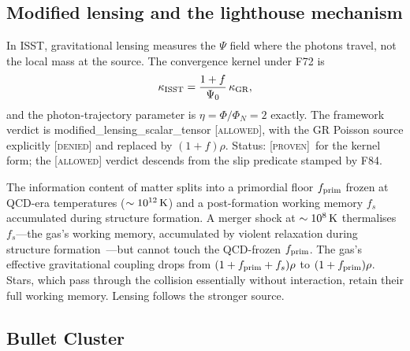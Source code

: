 \documentclass[aps,prd,twocolumn,nofootinbib,floatfix,superscriptaddress]{revtex4-2}
\newcommand{\PROVEN}{{\color{black!75!green}\textsc{[proven]}}}
\newcommand{\fprim}{f_{\rm prim}}
\begin{document}
\subsection{Modified lensing and the lighthouse mechanism}

In ISST, gravitational lensing measures the $\Psi$ field where the
photons travel, not the local mass at the source. The convergence
kernel under F72 is
\begin{equation}
\kappa_{\rm ISST} = \frac{1+f}{\Psi_0}\,\kappa_{\rm GR},
\end{equation}
and the photon-trajectory parameter is $\eta = \Phi/\Phi_N = 2$
exactly. The framework verdict is
\textsf{modified\_lensing\_scalar\_tensor} \textsc{[allowed]}, with
the GR Poisson source explicitly \textsc{[denied]} and replaced by
$(1{+}f)\rho$. Status: \PROVEN\ for the kernel form; the
\textsc{[allowed]} verdict descends from the slip predicate stamped
by F84.

The information content of matter splits into a primordial floor
$\fprim$ frozen at QCD-era temperatures ($\sim 10^{12}\,{\rm K}$) and
a post-formation working memory $f_s$ accumulated during structure
formation. A merger shock at $\sim 10^8\,{\rm K}$ thermalises
$f_s$---the gas's working memory, accumulated by violent relaxation
during structure formation~\cite{LyndenBell1967}---but cannot touch
the QCD-frozen $\fprim$. The gas's effective gravitational coupling drops from
$(1+\fprim+f_s)\rho$ to $(1+\fprim)\rho$. Stars, which pass through
the collision essentially without interaction, retain their full
working memory. Lensing follows the stronger source.

\subsection{Bullet Cluster}
\label{sec:bullet}
\end{document}
